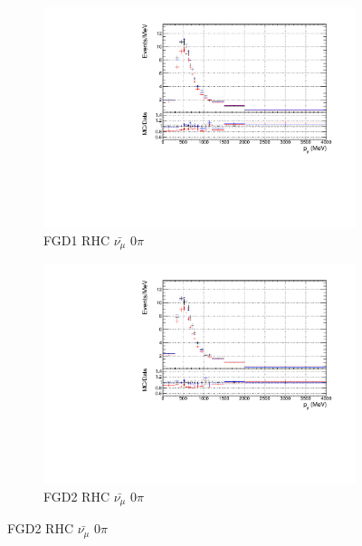 \begin{figure}[!htbp]
\begin{subfigure}{0.49\textwidth}
  \centering
  \includegraphics[width=\textwidth]{figs/priorpred1D_p_FGD1_anti-numuCC_0pi}
  \caption{FGD1 RHC $\bar{\nu_{\mu}}$ 0$\pi$}
\end{subfigure}
\begin{subfigure}{0.49\textwidth}
  \centering
  \includegraphics[width=\textwidth]{figs/priorpred1D_p_FGD2_anti-numuCC_0pi}
  \caption{FGD2 RHC $\bar{\nu_{\mu}}$ 0$\pi$}
\end{subfigure}


\end{figure}
